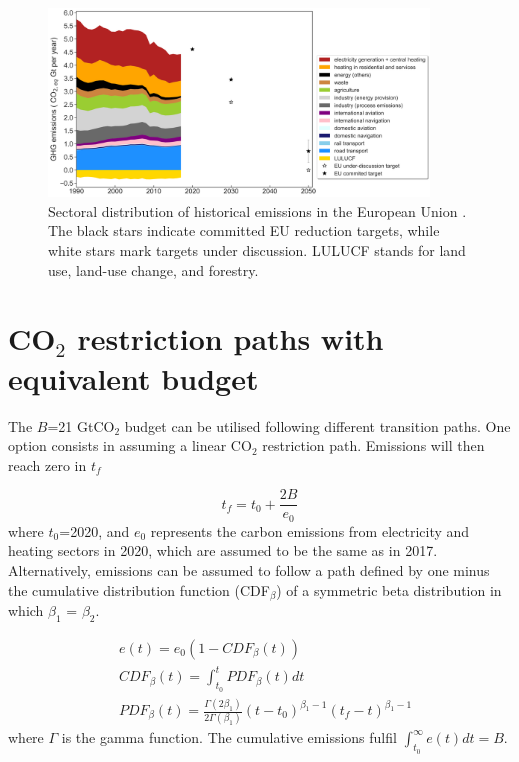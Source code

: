 \documentclass[3p]{elsarticle} %
\begin{document}
\begin{figure}[!h]
\centering
\includegraphics[width=0.9\textwidth]{../figures/historical_sectoral_emissions.png}
\caption{Sectoral distribution of historical emissions in the European Union \cite{UNFCCC_inventory}. The black stars indicate committed EU reduction targets, while white stars mark targets under discussion. LULUCF stands for land use, land-use change, and forestry.} \label{fig_historical_emissions} 
\end{figure}

\FloatBarrier

\section{CO$_2$ restriction paths with equivalent budget}

The $B$=21 GtCO$_2$ budget can be utilised following different transition paths. One option consists in assuming a linear CO$_2$ restriction path. Emissions will then reach zero in $t_f$

\begin{equation}
	t_f=t_0+\frac{2B}{e_0}
\end{equation}
where $t_0$=2020, and $e_0$ represents the carbon emissions from electricity and heating sectors in 2020, which are assumed to be the same as in 2017. \\

Alternatively, emissions can be assumed to follow a path defined by one minus the cumulative distribution function (CDF$_\beta$) of a symmetric beta distribution in which $\beta_1$ = $\beta_2$. 

\begin{equation}
\begin{aligned}
&	e (t) = e_0(1- CDF_{\beta}(t)) \\
&	CDF_{\beta} (t) =\int_{t_0}^{t} PDF_{\beta}(t) dt \\
&	PDF_{\beta} (t) =  \frac{\Gamma(2\beta_1)}{2\Gamma(\beta_1)} (t-t_0)^{\beta_1-1} (t_f-t)^{\beta_1-1}
\end{aligned}
\end{equation}
where $\Gamma$ is the gamma function. The cumulative emissions fulfil $\int_{t_0}^{\infty} e(t) dt =B$. \\
\end{document}
